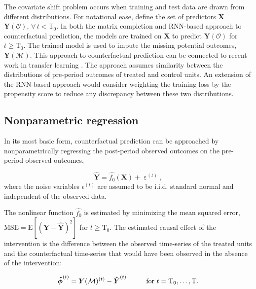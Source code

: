 \documentclass[hidelinks,12pt]{article}
\newcommand{\E}{\mathrm{E}}
\begin{document}
The covariate shift problem occurs when training and test data are drawn from different distributions. For notational ease, define the set of predictors $\boldsymbol{X}$ = $\boldsymbol{Y}(\mathcal{O}), \, \forall\, t < \text{T}_0$.  In both the matrix completion and RNN-based approach to counterfactual prediction, the models are trained on $\boldsymbol{X}$ to predict $\boldsymbol{Y}(\mathcal{O})$ for $t \geq \text{T}_0$. The trained model is used to impute the missing potential outcomes, $\boldsymbol{Y}(\mathcal{M})$. This approach to counterfactual prediction can be connected to recent work in transfer learning \citep{ben2007analysis,2015arXiv150507818G}. The approach assumes similarity between the distributions of pre-period outcomes of treated and control units. An extension of the RNN-based approach would consider weighting the training loss by the propensity score to reduce any discrepancy between these two distributions. 

\subsection{Nonparametric regression}

In its most basic form, counterfactual prediction can be approached by nonparametrically regressing the post-period observed outcomes on the pre-period observed outcomes,

\begin{equation}\label{eq:np}
  \boldsymbol{\hat{Y}} =  \hat{f_0} \left(\boldsymbol{X}\right) + \upepsilon^{(t)},
\end{equation}
\noindent
where the noise variables $\epsilon^{(t)}$ are assumed to be i.i.d. standard normal and independent of the observed data. 

The nonlinear function $\hat{f_0}$ is estimated by minimizing the mean squared error, $\text{MSE} = \E \left[\left(\boldsymbol{Y} - \boldsymbol{\hat{Y}} \right)^2 \right]$  for $t \geq \text{T}_0$. The estimated causal effect of the intervention is the difference between the observed time-series of the treated units and the counterfactual time-series that would have been observed in the absence of the intervention:

\begin{equation}\label{eq:pointwise}
  \boldsymbol{\hat{\phi}}^{(t)} = \boldsymbol{Y}(\mathcal{M})^{(t)} - \boldsymbol{\hat{Y}}^{(t)} \hspace{10mm} \text{for } t = \text{T}_0, \ldots, \text{T}. 
\end{equation}
\end{document}

